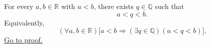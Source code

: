 \begin{theorem}
\label{thm:density-of-rationals-in-reals}
For every $a,b\in\mathbb{R}$ with $a<b$, there exists $q\in\mathbb{Q}$ such
that
\[
  a<q<b.
\]
Equivalently,
\[
  (\forall a,b\in\mathbb{R})
  \bigl[a<b\Longrightarrow(\exists q\in\mathbb{Q})(a<q<b)\bigr].
\]
\hyperref[prf:density-of-rationals-in-reals]{Go to proof.}
\end{theorem}
